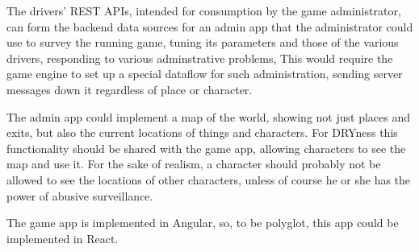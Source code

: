The drivers' REST APIs, intended for consumption by the game
administrator, can form the backend data sources for an admin app that
the administrator could use to survey the running game,
tuning its parameters and those of the various drivers, responding to
various adminstrative problems, \etc
This would require the game engine to set
up a special dataflow for such administration, sending server messages down
it regardless of place or character.

The admin app could implement a map of the world, showing not just places and
exits, but also the current locations of things and characters.
For DRYness this functionality should be shared with the game app, allowing
characters to see the map and use it.
For the sake of realism, a character should probably not be
allowed to see the locations of other characters, unless of course he
or she has the power of abusive surveillance.

The game app is implemented in Angular, so, to be polyglot, this app could be
implemented in React.